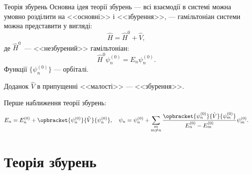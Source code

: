\documentclass[10pt]{beamer}
\begin{document}
\begin{frame}{Теорія збурень}{}
	Основна ідея теорії збурень --- всі взаємодії в системі можна умовно розділити на <<основні>> і <<збурення>>, --- гамільтоніан системи можна представити у вигляді:
	\begin{equation*}
		\hat{H} = \hat{H}^0 + \hat{V},
	\end{equation*}
	де  $\hat{H}^0$~--- <<незбурений>> гамільтоніан:
	\begin{equation*}
		\hat{H}^0\psi_n^{(0)} = E_n\psi_n^{(0)}.
	\end{equation*}
	Функції $\{\psi_n^{(0)}\}$ --- орбіталі.%

	Доданок $\hat{V}$ в припущенні <<малості>> --- <<збурення>>.

	Перше наближення теорії збурень:
	\begin{equation*}\label{PerturbedValues}
		E_n = E_n^{(0)} + \opbracket{\psi_n^{(0)}}{\hat{V}}{\psi_n^{(0)}}, \quad
		\psi_n = \psi_n^{(0)} + \sum\limits_{\substack{m\\m \neq n}} \frac{\opbracket{\psi_n^{(0)}}{\hat{V}}{\psi_m^{(0)}}}{E_n^{(0)} - E_m^{(0)}} \psi_m^{(0)}.
	\end{equation*}
\end{frame}





\section{Теорія збурень}
\end{document}
